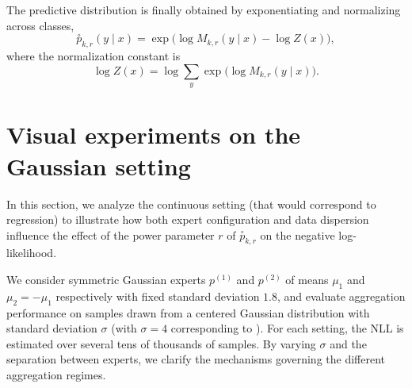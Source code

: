 \documentclass[accepted]{uai2026} %
\newcommand{\compose}[1]{\overset{\circ}{#1}}
\begin{document}
The predictive distribution is finally obtained by exponentiating and normalizing across classes,
\begin{equation}
\compose{p}_{k,r}(y \mid x)
=
\exp\!\big(
\log M_{k,r}(y \mid x) - \log Z(x)
\big),
\end{equation}
where the normalization constant is
\begin{equation}
\log Z(x)
=
\log
\sum_{y}
\exp\!\big(
\log M_{k,r}(y \mid x)
\big).
\end{equation}

\section{Visual experiments on the Gaussian setting
}\label{app: additional gaussian}

In this section, we analyze the continuous setting (that would correspond to regression) to illustrate how both expert configuration and data dispersion influence the effect of the power parameter $r$ of $\compose{p}_{k,r}$ on the negative log-likelihood.

We consider symmetric Gaussian experts $p^{(1)}$ and $p^{(2)}$ of means $\mu_1$ and $\mu_2 = -\mu_1$ respectively with fixed standard deviation $1.8$, and evaluate aggregation performance on samples drawn from a centered Gaussian distribution with standard deviation $\sigma$ (with $\sigma=4$ corresponding to ). For each setting, the NLL is estimated over several tens of thousands of samples. By varying $\sigma$ and the separation between experts, we clarify the mechanisms governing the different aggregation regimes.
\end{document}
